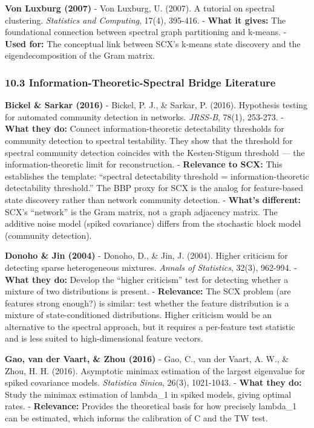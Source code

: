 \documentclass[
  12pt,
]{article}
\begin{document}
\textbf{Von Luxburg (2007)} - Von Luxburg, U. (2007). A tutorial on
spectral clustering. \emph{Statistics and Computing}, 17(4), 395-416. -
\textbf{What it gives:} The foundational connection between spectral
graph partitioning and k-means. - \textbf{Used for:} The conceptual link
between SCX's k-means state discovery and the eigendecomposition of the
Gram matrix.

\subsubsection{10.3 Information-Theoretic-Spectral Bridge
Literature}\label{information-theoretic-spectral-bridge-literature}

\textbf{Bickel \& Sarkar (2016)} - Bickel, P. J., \& Sarkar, P. (2016).
Hypothesis testing for automated community detection in networks.
\emph{JRSS-B}, 78(1), 253-273. - \textbf{What they do:} Connect
information-theoretic detectability thresholds for community detection
to spectral testability. They show that the threshold for spectral
community detection coincides with the Kesten-Stigum threshold --- the
information-theoretic limit for reconstruction. - \textbf{Relevance to
SCX:} This establishes the template: ``spectral detectability threshold
= information-theoretic detectability threshold.'' The BBP proxy for SCX
is the analog for feature-based state discovery rather than network
community detection. - \textbf{What's different:} SCX's ``network'' is
the Gram matrix, not a graph adjacency matrix. The additive noise model
(spiked covariance) differs from the stochastic block model (community
detection).

\textbf{Donoho \& Jin (2004)} - Donoho, D., \& Jin, J. (2004). Higher
criticism for detecting sparse heterogeneous mixtures. \emph{Annals of
Statistics}, 32(3), 962-994. - \textbf{What they do:} Develop the
``higher criticism'' test for detecting whether a mixture of two
distributions is present. - \textbf{Relevance:} The SCX problem (are
features strong enough?) is similar: test whether the feature
distribution is a mixture of state-conditioned distributions. Higher
criticism would be an alternative to the spectral approach, but it
requires a per-feature test statistic and is less suited to
high-dimensional feature vectors.

\textbf{Gao, van der Vaart, \& Zhou (2016)} - Gao, C., van der Vaart, A.
W., \& Zhou, H. H. (2016). Asymptotic minimax estimation of the largest
eigenvalue for spiked covariance models. \emph{Statistica Sinica},
26(3), 1021-1043. - \textbf{What they do:} Study the minimax estimation
of lambda\_1 in spiked models, giving optimal rates. -
\textbf{Relevance:} Provides the theoretical basis for how precisely
lambda\_1 can be estimated, which informs the calibration of C and the
TW test.
\end{document}
